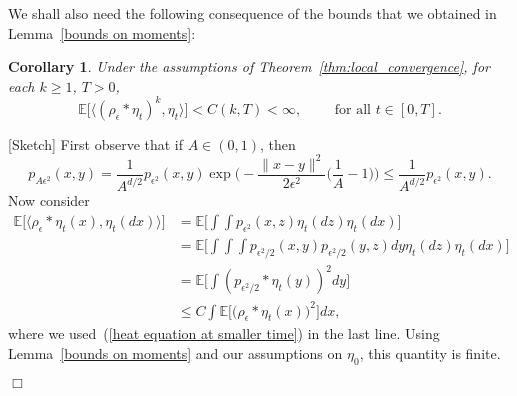 \documentclass[12pt]{article}
\newenvironment {proof}{{\noindent\bf Proof }}{\hfill $\Box$ \medskip}
\newtheorem{corollary}[theorem]{Corollary}
\newcommand{\IE}{\mathbb E}
\numberwithin{equation}{section}
\begin{document}
We shall also need the following consequence of the bounds that we obtained in 
Lemma~\ref{bounds on moments}:
\begin{corollary}
\label{alternative form moment bounds}
Under the assumptions of Theorem~\ref{thm:local_convergence},
for each $k\geq 1$, $T>0$,
\begin{equation}
\label{double integrals with respect to eta}
\IE\Big[\big\langle (\rho_\epsilon*\eta_t)^{k},\eta_t\big\rangle \Big]
<C(k,T)<\infty, \qquad\mbox{ for all }t\in [0,T].
\end{equation}
\end{corollary}
\begin{proof}[Sketch]
First observe that if $A\in (0,1)$, then 
\begin{equation}
\label{heat equation at smaller time}
p_{A\epsilon^2}(x,y)
=\frac{1}{A^{d/2}}p_{\epsilon^2}(x,y)\exp\Big(-\frac{\|x-y\|^2}{2\epsilon^2}
\big(\frac{1}{A}-1\big)\Big)\leq \frac{1}{A^{d/2}}p_{\epsilon^2}(x,y).
\end{equation}
Now consider
    \begin{align*}
\IE\big[\langle \rho_\epsilon*\eta_t(x),\eta_t(dx)\rangle\big]&=
\IE\Big[\int\int p_{\epsilon^2}(x,z)\eta_t(dz)\eta_t(dx)\Big]
\\        
&=
\IE\Big[\int\int\int p_{\epsilon^2/2}(x,y) 
p_{\epsilon^2/2}(y,z)dy\eta_t(dz)\eta_t(dx)\Big]
        \\ &=
       \IE\Big[ \int \left( p_{\epsilon^2/2} * \eta_t(y) \right)^2 dy \Big]
\\&\leq C\int \IE\big[\big(\rho_\epsilon*\eta_t(x)\big)^2\big] dx,
    \end{align*}
where we used~(\ref{heat equation at smaller time}) in the last line.
Using Lemma~\ref{bounds on moments}
and our assumptions on $\eta_0$, this quantity is finite.


\end{proof}
\end{document}

